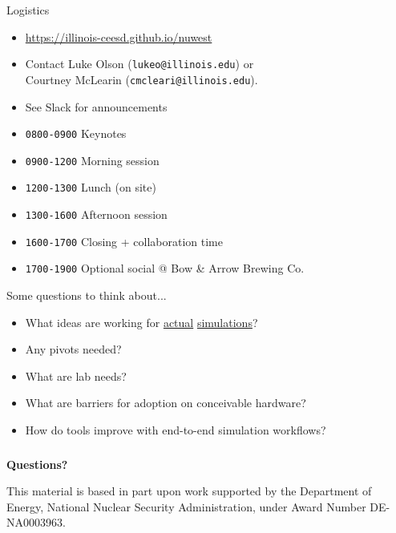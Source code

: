\documentclass[aspectratio=169]{beamer}
\begin{document}
\begin{frame}{Logistics}
\begin{itemize}
\item \url{https://illinois-ceesd.github.io/nuwest}
\item Contact Luke Olson (\texttt{lukeo@illinois.edu}) or\\
  \hspace{1.25cm} Courtney McLearin (\texttt{cmcleari@illinois.edu}).
\item See Slack for announcements
\item {\color{IllinoisOrange} \texttt{0800-0900}} Keynotes
\item {\color{IllinoisOrange} \texttt{0900-1200}} Morning session
\item {\color{IllinoisOrange} \texttt{1200-1300}} Lunch (on site)
\item {\color{IllinoisOrange} \texttt{1300-1600}} Afternoon session
\item {\color{IllinoisOrange} \texttt{1600-1700}} Closing + collaboration time
\item {\color{IllinoisOrange} \texttt{1700-1900}} Optional social @ Bow \& Arrow Brewing Co.
\end{itemize}
\end{frame}

\begin{frame}{Some questions to think about...}

\begin{itemize}
  \item What ideas are working for \underline{actual} \underline{simulations}?
\item Any pivots needed?
\item What are lab needs?
\item What are barriers for adoption on conceivable hardware?
\item How do tools improve with end-to-end simulation workflows?
\end{itemize}

\end{frame}

\begin{frame}\frametitle{}
\vspace*{0.2in}
\begin{center}
\vspace*{0.35in}

\textbf{\huge\color{IllinoisOrange} Questions?}

\vspace*{0.5in}
This material is based in part upon work supported by the Department of Energy, National Nuclear Security Administration, under Award Number DE-NA0003963. 
\end{center}
\end{frame}
\end{document}
